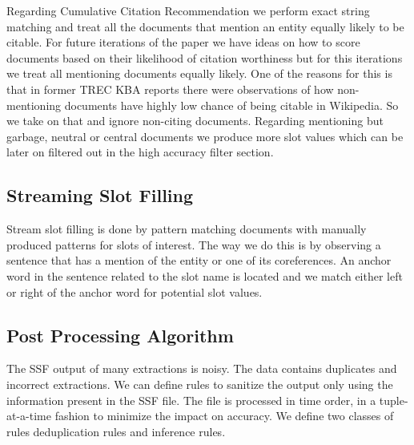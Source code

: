 Regarding Cumulative Citation Recommendation we perform exact string matching 
and treat all the documents that mention an entity equally likely to be citable.
For future iterations of the paper we have ideas on how to score documents 
based on their likelihood of citation worthiness but for this iterations we 
treat all mentioning documents equally likely. One of the reasons for this is 
that in former TREC KBA reports \cite{JFrank12} there were observations of how 
non-mentioning documents have highly low chance of being citable in Wikipedia.
So we take on that and ignore non-citing documents. Regarding mentioning but 
garbage, neutral or central documents we produce more slot values which can be 
later on filtered out in the high accuracy filter section.

\subsection{Streaming Slot Filling}
Stream slot filling is done by pattern matching documents with manually 
produced patterns for slots of interest. The way we do this is by observing a 
sentence that has a mention of the entity or one of its coreferences. An 
anchor word in the sentence related to the slot name is located and we match 
either left or right of the anchor word for potential slot values. 

\subsection{Post Processing Algorithm}

The SSF output of many extractions is noisy. The data contains duplicates and 
incorrect extractions. We can define rules to sanitize the output only using 
the information present in the SSF file. The file is processed in time order, 
in a tuple-at-a-time fashion to minimize the impact on accuracy. We define 
two classes of rules deduplication rules and inference rules.
